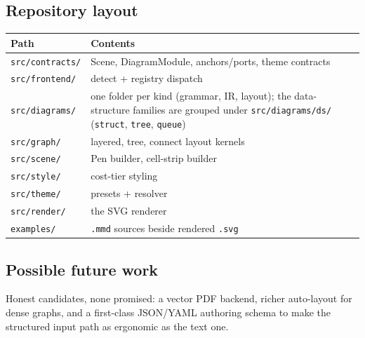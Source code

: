 \subsection{Repository layout}

\begin{center}
\begin{tabular}{ll}
\toprule
Path & Contents \\
\midrule
\texttt{src/contracts/} & Scene, DiagramModule, anchors/ports, theme contracts \\
\texttt{src/frontend/}  & detect + registry dispatch \\
\texttt{src/diagrams/}  & one folder per kind (grammar, IR, layout); the
                          data-structure families are grouped under
                          \texttt{src/diagrams/ds/} (\texttt{struct}, \texttt{tree},
                          \texttt{queue}) \\
\texttt{src/graph/}     & layered, tree, connect layout kernels \\
\texttt{src/scene/}     & Pen builder, cell-strip builder \\
\texttt{src/style/}     & cost-tier styling \\
\texttt{src/theme/}     & presets + resolver \\
\texttt{src/render/}    & the SVG renderer \\
\texttt{examples/}      & \texttt{.mmd} sources beside rendered \texttt{.svg} \\
\bottomrule
\end{tabular}
\end{center}

\subsection{Possible future work}

Honest candidates, none promised: a vector PDF backend, richer auto-layout for
dense graphs, and a first-class JSON/YAML authoring schema to make the structured
input path as ergonomic as the text one.
